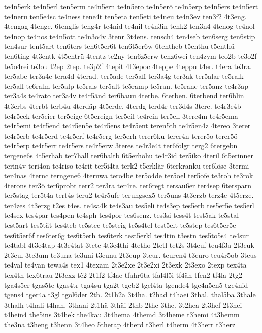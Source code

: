 {te4n5erk
te4n5erl
ten5erm
te4n5ern
te4n5ero
te4n5erö
te4n5erp
te4n5ers
te4n5ert
te4neru
ten5e4sc
te4ness
tene4t
ten5eta
ten5eti
te4neu
te4n3ev
ten3f2
4t3eng.
4tengag
4tenge.
6tenglis
teng4r
te4nid
te4nil
te4n3in
tenk2
ten3n4
4tenog
te4nol
te4nop
te4nos
te4n5ott
te4n3o4v
3tenr
3t4ens.
tensch4
ten4seb
ten6serg
ten6stip
ten4sur
tent5art
ten6ters
ten6t5er6t
ten6t5er6w
6tentheb
t5enthu
t5enthü
ten6ting
4t3entk
4t5entrü
4tentz
te2ny
ten6z5erw
tenz6wei
ten4zym
teo2b
te3o2f
te5o4rei
te3ou
t2ep
2tep.
te3p2f
4tepit
4t3epoc
4teppe
4teppu
t4er.
t4era
te3ra.
ter5abe
ter3a4c
tera4d
4terad.
ter5ade
ter5aff
ter3a4g
ter3ak
ter5alar
te5ralk
ter5all
te6ralm
ter5alp
te5rals
ter5alt
te5ramp
te5ran.
te5rane
ter5anz
te4r3ap
ter3a4s
te4rato
ter3a4v
te4r5änd
ter6bauu
4terbe.
6terben.
6terbend
ter6blin
4t3erbs
4terbt
terb4u
4terdäp
4t5erde.
4terdg
terd4r
ter3d4s
3tere.
te4r3e4b
te4r5eck
ter5eier
ter5eige
6t5ereign
ter5eil
te4rein
ter5ell
3tere4m
te4r5ema
te4r5emi
te4r5end
te4r5en5e
te4r5ens
te4r5ent
teren5th
te4r5en4z
4tereo
3terer
te4r5erb
te4r5erd
te4r5erf
te4r5erg
ter5erh
terer6ku
terer4n
terer5o
terer5ö
te4r5erp
te4r5err
te4r5ers
te4r5erw
3teres
te4r3e4t
ter6folgr
terg2
6tergebn
tergene6s
4t5erhab
ter7hall
ter6haltb
6t5erhöhu
te4r3id
ter5iko
4teril
6t5erinner
terin4v
teri4on
te4riso
te4rit
ter5i4ta
terk2
t5erklär
6terkranku
ter6löse
3termi
ter4nas
4ternc
terngene6
4ternwa
tero4be
ter5o4de
ter5oel
ter5ofe
te3roh
te3rok
4terons
ter3ö
ter6probt
terr2
ter3ra
ter4re.
ter6regt
tersau6er
ter4sep
6tersparn
ter5stag
ter5t4a
tert4s
teru2
te4r5ufe
terungsex5
ter5uns
4t3erzb
terz4e
4t5erze.
ter4zes
4t3erzg
t2es
t4es.
te4sa4k
te4s3au
tes5eli
te4s3ep
tes5erb
tes5er5e
tes5erl
te4sex
tes4par
tes4pen
te4sph
tes4por
tes6senz.
tes3si
tess4t
test5ak
te5stal
test5art
tes5tät
tes4teb
te5stec
te5steig
te5s4tel
test5elt
te5step
tes6t5er5e
tes6t5er6f
tes6ter6g
tes6t5erh
tes6terk
test5erkl
tes4tin
t3estn
tes5to5s4
te4sur
te4tabl
4t3e4tap
4t3e4tat
3tete
4t3e4thi
4tetho
2tetl
tet2s
3t4euf
teu4f3a
2t3euk
2t3eul
3te3um
te3una
te3uni
t3eunu
2t3eup
3teur.
teuren4
t3euro
teu4r5ob
3teus
te4val
te4van
tewa4s
tex1
4texam
2t3e2xe
2t3e2xi
2t3exk
2t3exo
2texp
tex4ta
tex4th
tex6trau
2t3exz
tè2
2t1f2
tf4ae
tfahr6ta
tfal4l5i
tf4äh
tfen2
tf4la
2tg2
tga4s5er
tgas5te
tgas4tr
tga4su
tga2t
tgeb2
tgel4ta
tgende4
tge4n5en5
tge4nid
tgens4
tger4a
t3gl
tgol6der
2th.
2t1h2a
3t4ha.
t2had
t4haei
3thal.
thal5ba
3thale
3thalh
t4hali
t4han.
3thani
2t1hä
3thäi
2thb
2thc
3the.
3t2hea
2t3hef
2t3hei
t4hein4
the5ins
3t4hek
the4kau
3t4hema
4themd
3t4heme
t3hemi
4t3hemm
the3na
t3heng
t3henn
3t4heo
5therap
4therd
t3herl
t4herm
4t3herr
t3herz
}
